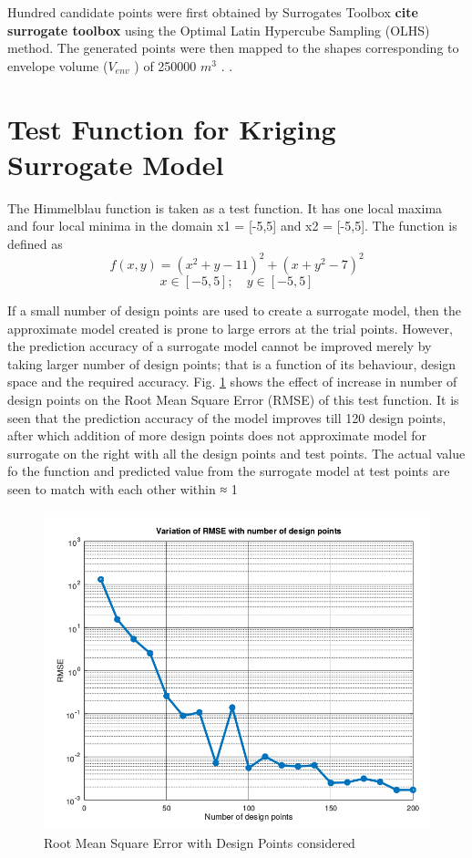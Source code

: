 Hundred candidate points were first obtained by Surrogates Toolbox \textbf{cite surrogate toolbox} using the Optimal Latin Hypercube Sampling (OLHS) method. The generated points were then mapped to the shapes corresponding to envelope volume ($ V _{env} $ ) of 250000 $ m^3 $ . .


\section{Test Function for Kriging Surrogate Model}
The Himmelblau function is taken as a test function.  It has one local maxima and four local minima in the domain x1 = [-5,5] and x2 = [-5,5]. The function is defined as 
\begin{equation}
f(x,y) = (x^2 + y - 11)^2  + (x + y^2 - 7)^2 
\end{equation}
\begin{equation}
x \in [-5,5] ;\quad y \in [-5,5]
\end{equation}

If a small number of design points are used to create a surrogate model, then the approximate model created is prone to large errors at the trial points. However, the prediction accuracy of a surrogate model cannot be improved merely by taking larger number of design points; that is a function of its behaviour, design space and the required accuracy. Fig. \ref{fig:Root Mean Square Error with Design Points considered} shows the effect of increase in number of design points on the Root Mean Square Error (RMSE) of this test function. It is seen that the prediction accuracy of the model improves till 120 design points, after which addition of more design points does not approximate model for surrogate on the right with all the design points and test points. The actual value fo the function and predicted value from the surrogate model at test points are seen to match with each other within ≈ 1%

\begin{figure}[H]
	\includegraphics[width=\textwidth]{optimization/RMSE_analysis.png}
	\caption{Root Mean Square Error with Design Points considered}
	\label{fig:Root Mean Square Error with Design Points considered} %
\end{figure}


